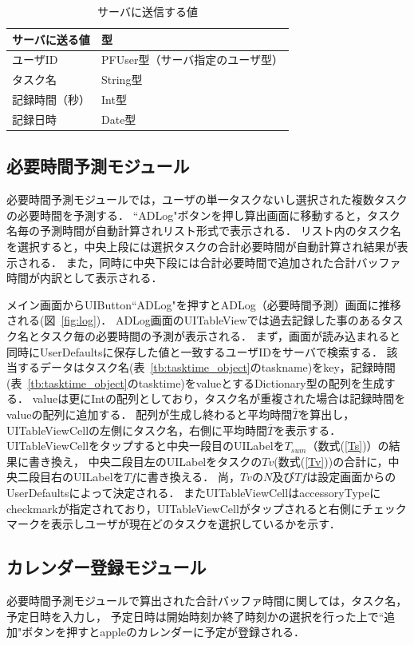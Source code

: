 \begin{table}[htb]
\begin{center}
  \caption{サーバに送信する値}
  \begin{tabular}{|l|l|}\hline
    サーバに送る値 & 型 \\ \hline
    ユーザID & PFUser型（サーバ指定のユーザ型） \\
    タスク名 & String型 \\
    記録時間（秒） & Int型 \\
    記録日時 & Date型 \\
	\hline
  \end{tabular}
  \label{tb:serverdata1}
\end{center}
\end{table}

\subsection{必要時間予測モジュール}
必要時間予測モジュールでは，ユーザの単一タスクないし選択された複数タスクの必要時間を予測する．
``ADLog"ボタンを押し算出画面に移動すると，タスク名毎の予測時間が自動計算されリスト形式で表示される．
リスト内のタスク名を選択すると，中央上段には選択タスクの合計必要時間が自動計算され結果が表示される．
また，同時に中央下段には合計必要時間で追加された合計バッファ時間が内訳として表示される．

メイン画面からUIButton``ADLog"を押すとADLog（必要時間予測）画面に推移される(図~\ref{fig:log})．
ADLog画面のUITableViewでは過去記録した事のあるタスク名とタスク毎の必要時間の予測が表示される．
まず，画面が読み込まれると同時にUserDefaultsに保存した値と一致するユーザIDをサーバで検索する．
該当するデータはタスク名(表~\ref{tb:tasktime_object}のtaskname)をkey，記録時間(表~\ref{tb:tasktime_object}のtasktime)をvalueとするDictionary型の配列を生成する．
valueは更にIntの配列としており，タスク名が重複された場合は記録時間をvalueの配列に追加する．
配列が生成し終わると平均時間$\bar{T}$を算出し，UITableViewCellの左側にタスク名，右側に平均時間$\bar{T}$を表示する．
UITableViewCellをタップすると中央一段目のUILabelを$T_{sum}$（数式(\ref{Ts})）の結果に書き換え，
中央二段目左のUILabelをタスクの$Tv$(数式(\ref{Tv}))の合計に，中央二段目右のUILabelを$Tf$に書き換える．
尚，$Tv$の$N$及び$Tf$は設定画面からのUserDefaultsによって決定される．
またUITableViewCellはaccessoryTypeにcheckmarkが指定されており，UITableViewCellがタップされると右側にチェックマークを表示しユーザが現在どのタスクを選択しているかを示す．

\subsection{カレンダー登録モジュール}
必要時間予測モジュールで算出された合計バッファ時間に関しては，タスク名，予定日時を入力し，
予定日時は開始時刻か終了時刻かの選択を行った上で``追加"ボタンを押すとappleのカレンダーに予定が登録される．

